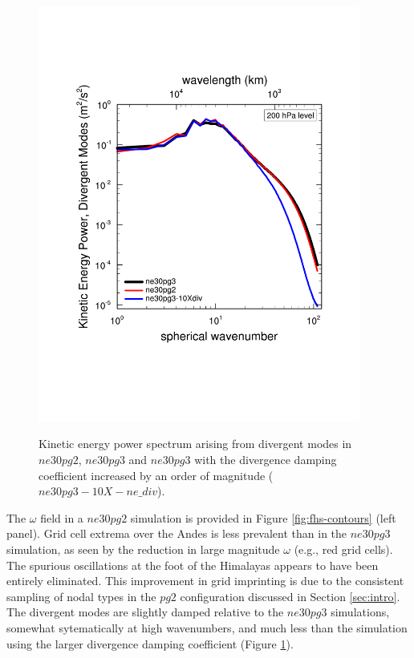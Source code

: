 \documentclass{agujournal}
\begin{document}
\begin{figure}[t]
\begin{center}
\noindent\includegraphics[width=25pc,angle=0]{figs/fhstopo_Divergence_ne30pg2-v-ne30pg3-v-10Xnudiv.pdf}\\
\end{center}
\caption{Kinetic energy power spectrum arising from divergent modes in $ne30pg2$, $ne30pg3$ and $ne30pg3$ with the divergence damping coefficient increased by an order of magnitude ($ne30pg3-10X-ne\_div$).}
\label{fig:fhs-div}
\end{figure}

The $\omega$ field in a $ne30pg2$ simulation is provided in Figure \ref{fig:fhs-contours} (left panel). Grid cell extrema over the Andes is less prevalent than in the $ne30pg3$ simulation, as seen by the reduction in large magnitude $\omega$ (e.g., red grid cells). The spurious oscillations at the foot of the Himalayas appears to have been entirely eliminated. This improvement in grid imprinting is due to the consistent sampling of nodal types in the $pg2$ configuration discussed in Section \ref{sec:intro}. The divergent modes are slightly damped relative to the $ne30pg3$ simulations, somewhat sytematically at high wavenumbers, and much less than the simulation using the larger divergence damping coefficient (Figure \ref{fig:fhs-div}).  
\end{document}
